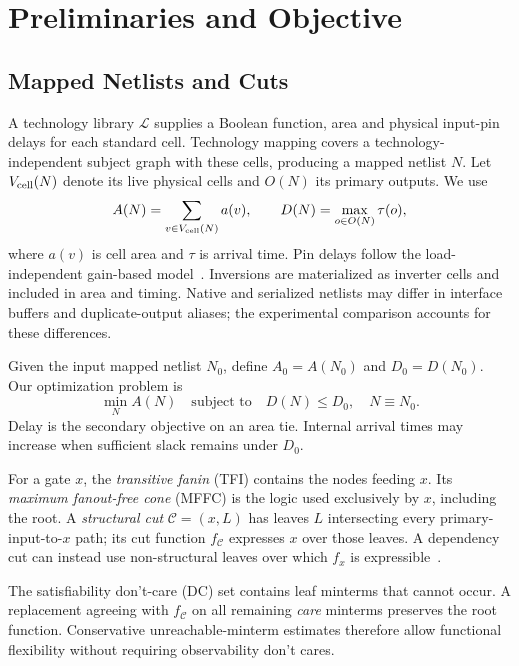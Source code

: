 \section{Preliminaries and Objective}
\subsection{Mapped Netlists and Cuts}
A technology library $\mathcal L$ supplies a Boolean function, area and physical input-pin delays for each standard cell. Technology mapping covers a technology-independent subject graph with these cells, producing a mapped netlist $N$. Let $V_{\rm cell}(N)$ denote its live physical cells and $O(N)$ its primary outputs. We use
\begin{equation}
 A(N)=\sum_{v\in V_{\rm cell}(N)}a(v),\qquad
 D(N)=\max_{o\in O(N)}\tau(o),\label{eq_area}
\end{equation}
where $a(v)$ is cell area and $\tau$ is arrival time. Pin delays follow the load-independent gain-based model~\cite{calvino2022mapping}. Inversions are materialized as inverter cells and included in area and timing. Native and serialized netlists may differ in interface buffers and duplicate-output aliases; the experimental comparison accounts for these differences.

Given the input mapped netlist $N_0$, define $A_0=A(N_0)$ and $D_0=D(N_0)$. Our optimization problem is
\begin{equation}
 \min_N A(N)\quad\text{subject to}\quad
 D(N)\le D_0,\quad N\equiv N_0.\label{eq:objective}
\end{equation}
Delay is the secondary objective on an area tie. Internal arrival times may increase when sufficient slack remains under $D_0$.

For a gate $x$, the \emph{transitive fanin} (TFI) contains the nodes feeding $x$. Its \emph{maximum fanout-free cone} (MFFC) is the logic used exclusively by $x$, including the root. A \emph{structural cut} $\mathcal C=(x,L)$ has leaves $L$ intersecting every primary-input-to-$x$ path; its cut function $f_{\mathcal C}$ expresses $x$ over those leaves. A dependency cut can instead use non-structural leaves over which $f_x$ is expressible~\cite{aspdac25}.

The satisfiability don't-care (DC) set contains leaf minterms that cannot occur. A replacement agreeing with $f_{\mathcal C}$ on all remaining \emph{care} minterms preserves the root function. Conservative unreachable-minterm estimates therefore allow functional flexibility without requiring observability don't cares.

